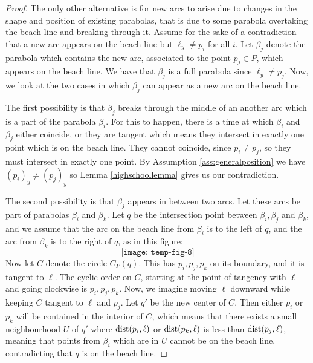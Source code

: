 \begin{proof}
The only other alternative is for new arcs to arise due to changes in the shape and position of existing parabolas, that is due to some parabola overtaking the beach line and breaking through it. Assume for the sake of a contradiction that a new arc appears on the beach line but $\ell_y \ne p_i$ for all $i$. Let $\beta_j$ denote the parabola which contains the new arc, associated to the point $p_j \in P$, which appears on the beach line. We have that $\beta_j$ is a full parabola since $\ell_y \ne p_j$. Now, we look at the two cases in which $\beta_j$ can appear as a new arc on the beach line.

The first possibility is that $\beta_j$ breaks through the middle of an another arc which is a part of the parabola $\beta_i$. For this to happen, there is a time at which $\beta_i$ and $\beta_j$ either coincide, or they are tangent which means they intersect in exactly one point which is on the beach line. They cannot coincide, since $p_i \ne p_j$, so they must intersect in exactly one point. By Assumption \ref{ass:generalposition} we have $(p_i)_y \ne (p_j)_y$ so Lemma \ref{highschoollemma} gives us our contradiction.

The second possibility is that $\beta_j$ appears in between two arcs. Let these arcs be part of parabolas $\beta_i$ and $\beta_k$. Let $q$ be the intersection point between $\beta_i, \beta_j$ and $\beta_k$, and we assume that the arc on the beach line from $\beta_i$ is to the left of $q$, and the arc from $\beta_k$ is to the right of $q$, as in this figure:
\[
    \texttt{[image: temp-fig-8]}
\]
Now let $C$ denote the circle $C_P(q)$. This has $p_i, p_j, p_k$ on its boundary, and it is tangent to $\ell$. The cyclic order on $C$, starting at the point of tangency with $\ell$ and going clockwise is $p_i, p_j, p_k$. Now, we imagine moving $\ell$ downward while keeping $C$ tangent to $\ell$ and $p_j$. Let $q'$ be the new center of $C$. Then either $p_i$ or $p_k$ will be contained in the interior of $C$, which means that there exists a small neighbourhood $U$ of $q'$ where $\operatorname{dist}(p_i, \ell)$ or $\operatorname{dist}(p_k, \ell)$ is less than $\operatorname{dist}(p_j, \ell)$, meaning that points from $\beta_i$ which are in $U$ cannot be on the beach line, contradicting that $q$ is on the beach line. 
\end{proof}

